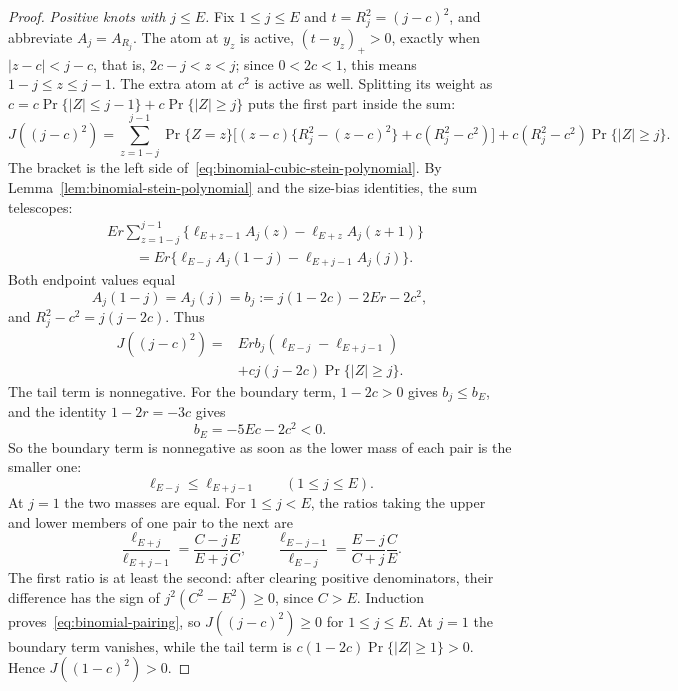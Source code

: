 \documentclass[11pt]{article}
\theoremstyle{remark}
\begin{document}
\begin{proof}
\emph{Positive knots with $j\leq E$.} Fix $1\leq j\leq E$ and
$t=R_j^2=(j-c)^2$, and abbreviate $A_j=A_{R_j}$.
The atom at $y_z$ is active, $(t-y_z)_+>0$, exactly when
$|z-c|<j-c$, that is, $2c-j<z<j$; since $0<2c<1$, this means
$1-j\leq z\leq j-1$. The extra atom at $c^2$ is active as well. Splitting its
weight as $c=c\Pr\{|Z|\leq j-1\}+c\Pr\{|Z|\geq j\}$ puts the first part inside
the sum:
\[
 J((j-c)^2)=\sum_{z=1-j}^{j-1}\Pr\{Z=z\}
 \bigl[(z-c)\{R_j^2-(z-c)^2\}+c(R_j^2-c^2)\bigr]
 +c(R_j^2-c^2)\Pr\{|Z|\geq j\}.
\]
The bracket is the left side of~\eqref{eq:binomial-cubic-stein-polynomial}.
By Lemma~\ref{lem:binomial-stein-polynomial} and the size-bias identities,
the sum telescopes:
\begin{align*}
 &Er\sum_{z=1-j}^{j-1}
 \{\ell_{E+z-1}A_j(z)-\ell_{E+z}A_j(z+1)\}\\
 &\hspace{2em}=Er\{\ell_{E-j}A_j(1-j)-\ell_{E+j-1}A_j(j)\}.
\end{align*}
Both endpoint values equal
\[
 A_j(1-j)=A_j(j)=b_j:=j(1-2c)-2Er-2c^2,
\]
and $R_j^2-c^2=j(j-2c)$. Thus
\begin{equation}\label{eq:binomial-positive-knot}
 \begin{split}
 J((j-c)^2)={}&Er b_j(\ell_{E-j}-\ell_{E+j-1})\\
              &+cj(j-2c)\Pr\{|Z|\geq j\}.
 \end{split}
\end{equation}
The tail term is nonnegative. For the boundary term, $1-2c>0$ gives
$b_j\leq b_E$, and the identity $1-2r=-3c$ gives
\[
 b_E=-5Ec-2c^2<0.
\]
So the boundary term is nonnegative as soon as the lower mass of each pair
is the smaller one:
\begin{equation}\label{eq:binomial-pairing}
 \ell_{E-j}\leq\ell_{E+j-1}\qquad(1\leq j\leq E).
\end{equation}
At $j=1$ the two masses are equal. For $1\leq j<E$, the ratios taking the
upper and lower members of one pair to the next are
\[
 \frac{\ell_{E+j}}{\ell_{E+j-1}}
 =\frac{C-j}{E+j}\frac EC,\qquad
 \frac{\ell_{E-j-1}}{\ell_{E-j}}
 =\frac{E-j}{C+j}\frac CE.
\]
The first ratio is at least the second: after clearing positive
denominators, their difference has the sign of $j^2(C^2-E^2)\geq0$, since
$C>E$. Induction proves~\eqref{eq:binomial-pairing}, so
$J((j-c)^2)\geq0$ for $1\leq j\leq E$. At $j=1$ the boundary term vanishes,
while the tail term is $c(1-2c)\Pr\{|Z|\geq1\}>0$. Hence $J((1-c)^2)>0$.


\end{proof}
\end{document}
